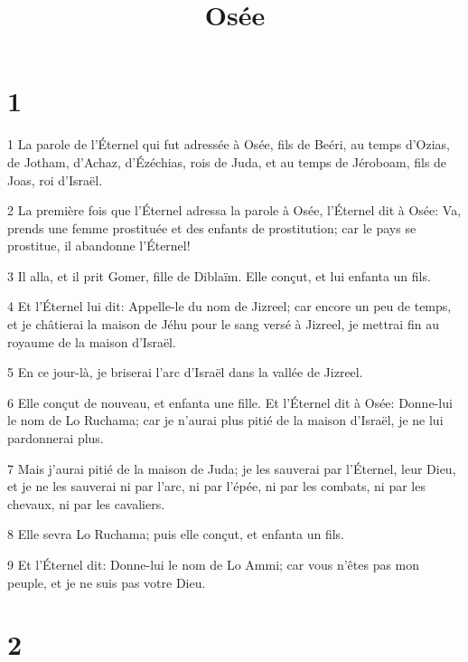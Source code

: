 

\title{Osée}


\chapter{1}

\par 1 La parole de l'Éternel qui fut adressée à Osée, fils de Beéri, au temps d'Ozias, de Jotham, d'Achaz, d'Ézéchias, rois de Juda, et au temps de Jéroboam, fils de Joas, roi d'Israël.
\par 2 La première fois que l'Éternel adressa la parole à Osée, l'Éternel dit à Osée: Va, prends une femme prostituée et des enfants de prostitution; car le pays se prostitue, il abandonne l'Éternel!
\par 3 Il alla, et il prit Gomer, fille de Diblaïm. Elle conçut, et lui enfanta un fils.
\par 4 Et l'Éternel lui dit: Appelle-le du nom de Jizreel; car encore un peu de temps, et je châtierai la maison de Jéhu pour le sang versé à Jizreel, je mettrai fin au royaume de la maison d'Israël.
\par 5 En ce jour-là, je briserai l'arc d'Israël dans la vallée de Jizreel.
\par 6 Elle conçut de nouveau, et enfanta une fille. Et l'Éternel dit à Osée: Donne-lui le nom de Lo Ruchama; car je n'aurai plus pitié de la maison d'Israël, je ne lui pardonnerai plus.
\par 7 Mais j'aurai pitié de la maison de Juda; je les sauverai par l'Éternel, leur Dieu, et je ne les sauverai ni par l'arc, ni par l'épée, ni par les combats, ni par les chevaux, ni par les cavaliers.
\par 8 Elle sevra Lo Ruchama; puis elle conçut, et enfanta un fils.
\par 9 Et l'Éternel dit: Donne-lui le nom de Lo Ammi; car vous n'êtes pas mon peuple, et je ne suis pas votre Dieu.

\chapter{2}

